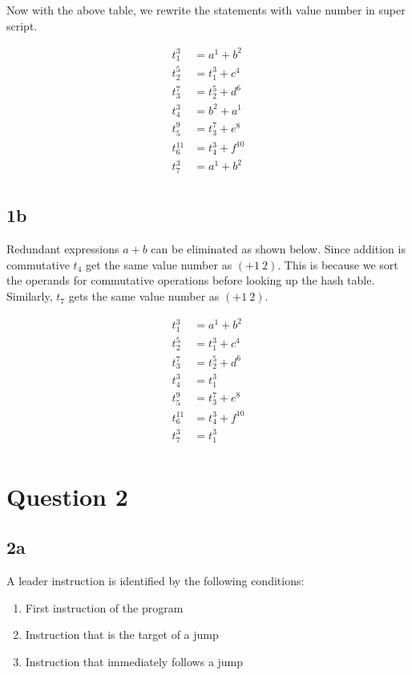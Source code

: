 \documentclass{article}
\begin{document}
    Now with the above table, we rewrite the statements with value number in super script.

    \begin{align*}
        t_1^3       & = a^1 + b^2 \\
        t_2^5       & = t_1^3 + c^4 \\
        t_3^7       & = t_2^5 + d^6 \\
        t_4^3       & = b^2 + a^1 \\
        t_5^9       & = t_3^7 + e^8 \\
        t_6^{11}    & = t_4^3 + f^{10} \\
        t_7^3       & = a^1 + b^2 \\
    \end{align*}

    \subsection*{1b}
    Redundant expressions $a + b$ can be eliminated as shown below. Since addition is commutative $t_4$ get the same value number as $(+ 1 \ 2)$. This is because we sort the operands for commutative operations before looking up the hash table. Similarly, $t_7$ gets the same value number as $(+ 1 \ 2)$.

    \begin{align*}
        t_1^3       & = a^1 + b^2 \\
        t_2^5       & = t_1^3 + c^4 \\
        t_3^7       & = t_2^5 + d^6 \\
        t_4^3       & = t_1^3 \\
        t_5^9       & = t_3^7 + e^8 \\
        t_6^{11}    & = t_4^3 + f^{10} \\
        t_7^3       & = t_1^3 \\
    \end{align*}

    \section*{Question 2}

    \subsection*{2a}
    A leader instruction is identified by the following conditions:
    \begin{enumerate}
        \item First instruction of the program
        \item Instruction that is the target of a jump
        \item Instruction that immediately follows a jump
    \end{enumerate}
\end{document}
